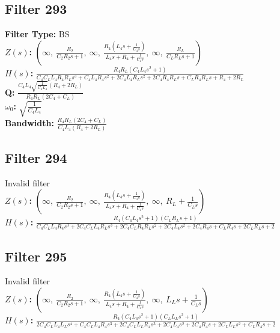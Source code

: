 \documentclass{article}
\begin{document}
\subsection*{Filter 293}
\textbf{Filter Type:} BS \\ 
\textbf{$Z(s)$:} $\left( \infty, \  \frac{R_{2}}{C_{2} R_{2} s + 1}, \  \infty, \  \frac{R_{4} \left(L_{4} s + \frac{1}{C_{4} s}\right)}{L_{4} s + R_{4} + \frac{1}{C_{4} s}}, \  \infty, \  \frac{R_{L}}{C_{L} R_{L} s + 1}\right)$ \\ 
\textbf{$H(s)$:} $\frac{R_{4} R_{L} \left(C_{4} L_{4} s^{2} + 1\right)}{C_{4} C_{L} L_{4} R_{4} R_{L} s^{3} + C_{4} L_{4} R_{4} s^{2} + 2 C_{4} L_{4} R_{L} s^{2} + 2 C_{4} R_{4} R_{L} s + C_{L} R_{4} R_{L} s + R_{4} + 2 R_{L}}$ \\ 
\textbf{Q:} $\frac{C_{4} L_{4} \sqrt{\frac{1}{C_{4} L_{4}}} \left(R_{4} + 2 R_{L}\right)}{R_{4} R_{L} \left(2 C_{4} + C_{L}\right)}$ \\ 
\textbf{$\omega_0$:} $\sqrt{\frac{1}{C_{4} L_{4}}}$ \\ 
\textbf{Bandwidth:} $\frac{R_{4} R_{L} \left(2 C_{4} + C_{L}\right)}{C_{4} L_{4} \left(R_{4} + 2 R_{L}\right)}$ \\ 
\subsection*{Filter 294}
Invalid filter \\ 
\textbf{$Z(s)$:} $\left( \infty, \  \frac{R_{2}}{C_{2} R_{2} s + 1}, \  \infty, \  \frac{R_{4} \left(L_{4} s + \frac{1}{C_{4} s}\right)}{L_{4} s + R_{4} + \frac{1}{C_{4} s}}, \  \infty, \  R_{L} + \frac{1}{C_{L} s}\right)$ \\ 
\textbf{$H(s)$:} $\frac{R_{4} \left(C_{4} L_{4} s^{2} + 1\right) \left(C_{L} R_{L} s + 1\right)}{C_{4} C_{L} L_{4} R_{4} s^{3} + 2 C_{4} C_{L} L_{4} R_{L} s^{3} + 2 C_{4} C_{L} R_{4} R_{L} s^{2} + 2 C_{4} L_{4} s^{2} + 2 C_{4} R_{4} s + C_{L} R_{4} s + 2 C_{L} R_{L} s + 2}$ \\ 
\subsection*{Filter 295}
Invalid filter \\ 
\textbf{$Z(s)$:} $\left( \infty, \  \frac{R_{2}}{C_{2} R_{2} s + 1}, \  \infty, \  \frac{R_{4} \left(L_{4} s + \frac{1}{C_{4} s}\right)}{L_{4} s + R_{4} + \frac{1}{C_{4} s}}, \  \infty, \  L_{L} s + \frac{1}{C_{L} s}\right)$ \\ 
\textbf{$H(s)$:} $\frac{R_{4} \left(C_{4} L_{4} s^{2} + 1\right) \left(C_{L} L_{L} s^{2} + 1\right)}{2 C_{4} C_{L} L_{4} L_{L} s^{4} + C_{4} C_{L} L_{4} R_{4} s^{3} + 2 C_{4} C_{L} L_{L} R_{4} s^{3} + 2 C_{4} L_{4} s^{2} + 2 C_{4} R_{4} s + 2 C_{L} L_{L} s^{2} + C_{L} R_{4} s + 2}$ \\ 
\end{document}
